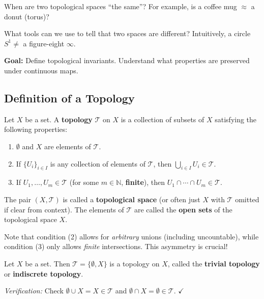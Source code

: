 \documentclass[11pt]{report}
\begin{document}
\begin{questbox}
When are two topological spaces ``the same''? For example, is a coffee mug $\approx$ a donut (torus)?

What tools can we use to tell that two spaces are different? Intuitively, a circle $S^1 \neq$ a figure-eight $\infty$.
\end{questbox}

\textbf{Goal:} Define topological invariants. Understand what properties are preserved under continuous maps.

\subsection{Definition of a Topology}

\begin{defbox}[Topology]
Let $X$ be a set. A \textbf{topology} $\mathcal{T}$ on $X$ is a collection of subsets of $X$ satisfying the following properties:
\begin{enumerate}
    \item $\emptyset$ and $X$ are elements of $\mathcal{T}$.
    \item If $\{U_i\}_{i \in I}$ is any collection of elements of $\mathcal{T}$, then $\bigcup_{i \in I} U_i \in \mathcal{T}$.
    \item If $U_1, \ldots, U_m \in \mathcal{T}$ (for some $m \in \mathbb{N}$, \textbf{finite}), then $U_1 \cap \cdots \cap U_m \in \mathcal{T}$.
\end{enumerate}
The pair $(X, \mathcal{T})$ is called a \textbf{topological space} (or often just $X$ with $\mathcal{T}$ omitted if clear from context). The elements of $\mathcal{T}$ are called the \textbf{open sets} of the topological space $X$.
\end{defbox}

\begin{rembox}
Note that condition (2) allows for \emph{arbitrary} unions (including uncountable), while condition (3) only allows \emph{finite} intersections. This asymmetry is crucial!
\end{rembox}

\begin{exbox}
Let $X$ be a set. Then $\mathcal{T} = \{\emptyset, X\}$ is a topology on $X$, called the \textbf{trivial topology} or \textbf{indiscrete topology}.

\textit{Verification:} Check $\emptyset \cup X = X \in \mathcal{T}$ and $\emptyset \cap X = \emptyset \in \mathcal{T}$. $\checkmark$
\end{exbox}
\end{document}
